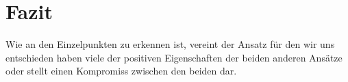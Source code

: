 \section*{Fazit}
Wie an den Einzelpunkten zu erkennen ist, vereint der Ansatz für den wir uns entschieden haben viele der positiven Eigenschaften der beiden anderen Ansätze oder stellt einen Kompromiss zwischen den beiden dar.
% 
